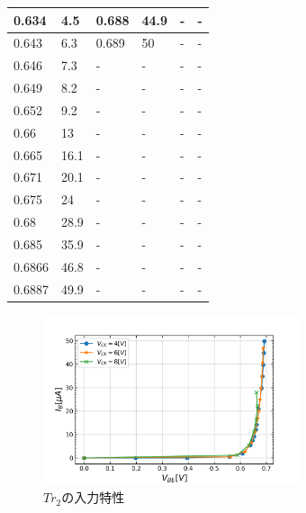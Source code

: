 \documentclass[10pt, a4j, dvipdfmx]{jarticle}
\begin{document}
\begin{table}[H]
\begin{tabular}{|l|l|l|l|l|l|}
        0.634                   & 4.5      & 0.688                   & 44.9     & -                       & -        \\ \hline
        0.643                   & 6.3      & 0.689                   & 50       & -                       & -        \\ \hline
        0.646                   & 7.3      & -                       & -        & -                       & -        \\ \hline
        0.649                   & 8.2      & -                       & -        & -                       & -        \\ \hline
        0.652                   & 9.2      & -                       & -        & -                       & -        \\ \hline
        0.66                    & 13       & -                       & -        & -                       & -        \\ \hline
        0.665                   & 16.1     & -                       & -        & -                       & -        \\ \hline
        0.671                   & 20.1     & -                       & -        & -                       & -        \\ \hline
        0.675                   & 24       & -                       & -        & -                       & -        \\ \hline
        0.68                    & 28.9     & -                       & -        & -                       & -        \\ \hline
        0.685                   & 35.9     & -                       & -        & -                       & -        \\ \hline
        0.6866                  & 46.8     & -                       & -        & -                       & -        \\ \hline
        0.6887                  & 49.9     & -                       & -        & -                       & -        \\ \hline
        \end{tabular}
        \normalsize
    \end{table}
    \begin{figure}[H]
        \centering
        \includegraphics[height=50mm]{ex-2.png}
        \caption{$Tr_2$の入力特性}
        \label{ex:2}    
    \end{figure}
\end{document}
